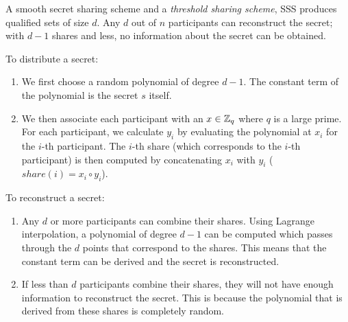\begin{definition} \label{def:sss}
 A smooth secret sharing scheme and a \textit{threshold sharing scheme}, SSS produces qualified sets of size $d$. Any $d$ out of $n$ participants can reconstruct the secret; with $d-1$ shares and less, no information about the secret can be obtained. 

 To distribute a secret:
\begin{enumerate}
    \item We first choose a random polynomial of degree $d - 1$. The constant term of the polynomial is the secret $s$ itself.
    \item We then associate each participant with an $x \in \mathbb{Z}_q$ where $q$ is a large prime. For each participant, we calculate $y_i$ by evaluating the polynomial at $x_i$ for the $i$-th participant. The $i$-th share (which corresponds to the $i$-th participant) is then computed by concatenating $x_i$ with $y_i$ ($share(i) = x_i\circ y_i$).
\end{enumerate}

To reconstruct a secret:
\begin{enumerate}
    \item Any $d$ or more participants can combine their shares. Using Lagrange interpolation, a polynomial of degree $d - 1$ can be computed which passes through the $d$ points that correspond to the shares. This means that the constant term can be derived and the secret is reconstructed. 
    \item If less than $d$ participants combine their shares, they will not have enough information to reconstruct the secret. This is because the polynomial that is derived from these shares is completely random. 
\end{enumerate}
\end{definition}

